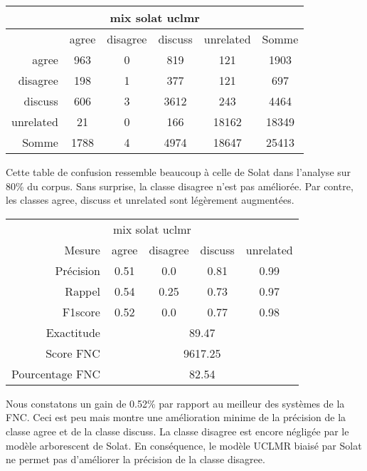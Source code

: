 \documentclass[onecolumn, 12pt]{article}
\begin{document}
\begin{center}
 \begin{tabular}{ r | c c c c | c }
  \multicolumn{6}{c}{mix solat uclmr}\\
  \hline
            & agree & disagree & discuss & unrelated & Somme \\
  \hline
  agree     & 963   & 0        & 819     & 121       & 1903  \\
  disagree  & 198   & 1        & 377     & 121       & 697   \\
  discuss   & 606   & 3        & 3612    & 243       & 4464  \\
  unrelated & 21    & 0        & 166     & 18162     & 18349 \\
  \hline
  Somme     & 1788  & 4        & 4974    & 18647     & 25413 \\
 \end{tabular}
\end{center}
Cette table de confusion ressemble beaucoup à celle de Solat dans l'analyse sur 80\% du corpus.
Sans surprise, la classe disagree n'est pas améliorée.
Par contre, les classes agree, discuss et unrelated sont légèrement augmentées.

\begin{center}
 \begin{tabular}{ r | c c c c }
  \multicolumn{5}{c}{mix solat uclmr}\\
  Mesure     & agree & disagree & discuss & unrelated \\
  \hline
  Précision & 0.51  & 0.0      & 0.81    & 0.99      \\
  Rappel     & 0.54  & 0.25     & 0.73    & 0.97      \\
  F1score    & 0.52  & 0.0      & 0.77    & 0.98      \\
  \hline
  \hline
  Exactitude & \multicolumn{4}{c}{89.47}\\
  Score FNC & \multicolumn{4}{c}{9617.25}\\
  Pourcentage FNC & \multicolumn{4}{c}{82.54}\\
 \end{tabular}
\end{center}
Nous constatons un gain de 0.52\% par rapport au meilleur des systèmes de la FNC.
Ceci est peu mais montre une amélioration minime de la précision de la classe agree et de la classe discuss.
La classe disagree est encore négligée par le modèle arborescent de Solat.
En conséquence, le modèle UCLMR biaisé par Solat ne permet pas d'améliorer la précision de la classe disagree.
\end{document}
